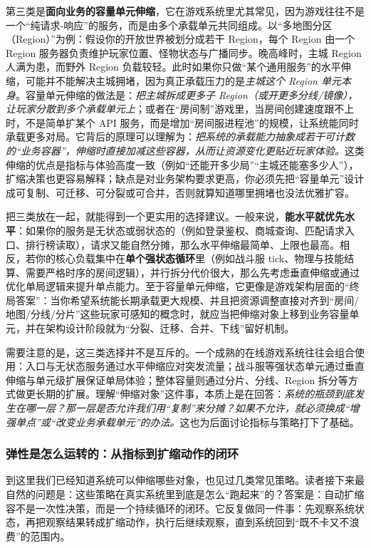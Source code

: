 第三类是\textbf{面向业务的容量单元伸缩}，它在游戏系统里尤其常见，因为游戏往往不是一个“纯请求-响应”的服务，而是由多个承载单元共同组成。以“多地图分区（Region）”为例：假设你的开放世界被划分成若干 Region，每个 Region 由一个 Region 服务器负责维护玩家位置、怪物状态与广播同步。晚高峰时，主城 Region 人满为患，而野外 Region 负载较轻。此时如果你只做“某个通用服务”的水平伸缩，可能并不能解决主城拥堵，因为真正承载压力的是\emph{主城这个 Region 单元本身}。容量单元伸缩的做法是：\emph{把主城拆成更多子 Region（或开更多分线/镜像），让玩家分散到多个承载单元上}；或者在“房间制”游戏里，当房间创建速度跟不上时，不是简单扩某个 API 服务，而是增加“房间服进程池”的规模，让系统能同时承载更多对局。它背后的原理可以理解为：\emph{把系统的承载能力抽象成若干可计数的“业务容器”，伸缩时直接加减这些容器，从而让资源变化更贴近玩家体验。}这类伸缩的优点是指标与体验高度一致（例如“还能开多少局”“主城还能塞多少人”），扩缩决策也更容易解释；缺点是对业务架构要求更高，你必须先把“容量单元”设计成可复制、可迁移、可分裂或可合并，否则就算知道哪里拥堵也没法优雅扩容。

把三类放在一起，就能得到一个更实用的选择建议。一般来说，\textbf{能水平就优先水平}：如果你的服务是无状态或弱状态的（例如登录鉴权、商城查询、匹配请求入口、排行榜读取），请求又能自然分摊，那么水平伸缩最简单、上限也最高。相反，若你的核心负载集中在\textbf{单个强状态循环}里（例如战斗服 tick、物理与技能结算、需要严格时序的房间逻辑），并行拆分代价很大，那么先考虑垂直伸缩或通过优化单局逻辑来提升单点能力。至于容量单元伸缩，它更像是游戏架构层面的“终局答案”：当你希望系统能长期承载更大规模、并且把资源调整直接对齐到“房间/地图/分线/分片”这些玩家可感知的概念时，就应当把伸缩对象上移到业务容量单元，并在架构设计阶段就为“分裂、迁移、合并、下线”留好机制。

需要注意的是，这三类选择并不是互斥的。一个成熟的在线游戏系统往往会组合使用：入口与无状态服务通过水平伸缩应对突发流量；战斗服等强状态单元通过垂直伸缩与单元级扩展保证单局体验；整体容量则通过分片、分线、Region 拆分等方式做更长期的扩展。理解“伸缩对象”这件事，本质上是在回答：\emph{系统的瓶颈到底发生在哪一层？那一层是否允许我们用“复制”来分摊？如果不允许，就必须换成“增强单点”或“改变业务承载单元”的办法。}这也为后面讨论指标与策略打下了基础。

\subsubsection{弹性是怎么运转的：从指标到扩缩动作的闭环}
到这里我们已经知道系统可以伸缩哪些对象，也见过几类常见策略。读者接下来最自然的问题是：这些策略在真实系统里到底是怎么“跑起来”的？答案是：自动扩缩容不是一次性决策，而是一个持续循环的闭环。它反复做同一件事：先观察系统状态，再把观察结果转成扩缩动作，执行后继续观察，直到系统回到“既不卡又不浪费”的范围内。

